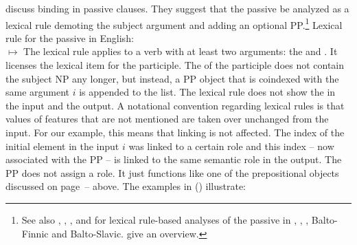 \documentclass[output=paper,biblatex,babelshorthands,newtxmath,draftmode,colorlinks,citecolor=brown]{langscibook}
\begin{document}


\citet{MS98a} discuss binding in passive clauses. They suggest that the passive be analyzed as a
lexical rule demoting the subject argument and adding an optional PP.\footnote{
  See also , , , and  for lexical rule-based analyses of the
  passive in 
, , , Balto-Finnic and Balto-Slavic.  give an overview.
} 
\ea
Lexical rule for the passive in English:\\
$\mapsto$
\z
The lexical rule applies to a verb with at least two arguments: the \NPi and . It licenses
the lexical item for the participle. The \argstl of the participle does not contain the subject NP
any longer, but instead, a PP object that is coindexed with the same argument $i$ is appended to the list. 
The lexical rule does not show the \contv in the input and the output. A notational convention
regarding lexical rules is that values of features that are not mentioned are taken over unchanged
from the input. For our example, this means that linking is not affected. The index of the initial
element in the input $i$ was linked to a certain role and this index -- now associated with the PP
-- is linked to the same semantic role in the output. The PP does not assign a role. It just
functions like one of the prepositional objects discussed on
page~\pageref{binding:page-prepositional-objects-start}--\pageref{binding:page-prepositional-objects-end}
above. The examples in () illustrate:
\end{document}
